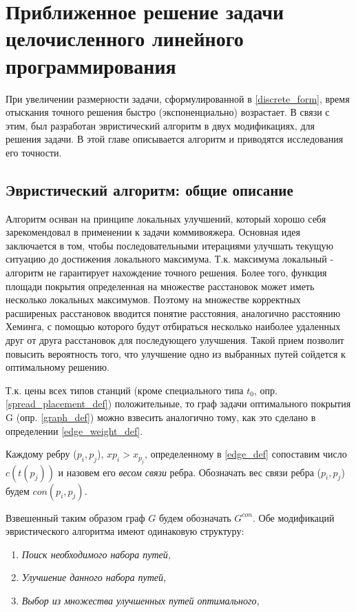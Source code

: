 \chapter{Приближенное решение задачи целочисленного линейного программирования} \label{ch:aprox_solution}
При увеличении размерности задачи, сформулированной в \ref{discrete_form}, время отыскания точного решения быстро (экспоненциально) возрастает. 
В связи с этим, был разработан эвристический алгоритм в двух модификациях, для решения задачи. В этой главе описывается алгоритм и приводятся исследования его точности.

\section{Эвристический алгоритм: общие описание} \label{heuristic_GLPK}
Алгоритм оснван на принципе локальных улучшений, который хорошо себя зарекомендовал в применении к задачи коммивояжера. Основная идея заключается в том, чтобы последовательными итерациями улучшать текущую ситуацию до достижения локального максимума. Т.к. максимума локальный - алгоритм не гарантирует нахождение точного решения. Более того, функция площади покрытия определенная на множестве расстановок может иметь несколько локальных максимумов. Поэтому на множестве корректных расширеных расстановок вводится понятие расстояния, аналогично расстоянию Хеминга, с помощью которого будут отбираться несколько наиболее удаленных друг от друга расстановок для последующего улучшения. Такой прием позволит повысить вероятность того, что улучшение одно из выбранных путей сойдется к оптимальному решению.

Т.к. цены всех типов станций (кроме специального типа $t_{0}$, опр. \ref{spread_placement_def}) положительные, то граф задачи оптимального покрытия G (опр. \ref{graph_def}) можно взвесить аналогично тому, как это сделано в определении \ref{edge_weight_def}.
\begin{mydef} \label{edge_connection_weight_def}
	Каждому ребру ($p_{i}, p_{j}$), $x{p_{i}} > x_{p_{j}}$,  определенному в \ref{edge_def} сопоставим число $c(t(p_{j}))$ и назовем его \textit{весом связи} ребра. Обозначать вес связи ребра ($p_{i}, p_{j}$) будем $con(p_{i}, p_{j})$.
\end{mydef}

Взвешенный таким образом граф $G$ будем обозначать $G^{con}$.
Обе модификаций эвристического алгоритма имеют одинаковую структуру:
\begin{enumerate}
	\item \textit{Поиск необходимого набора путей,} 
	
	\item \textit{Улучшение данного набора путей,} 
	
	\item \textit{Выбор из множества улучшенных путей оптимального,} 
\end{enumerate}

